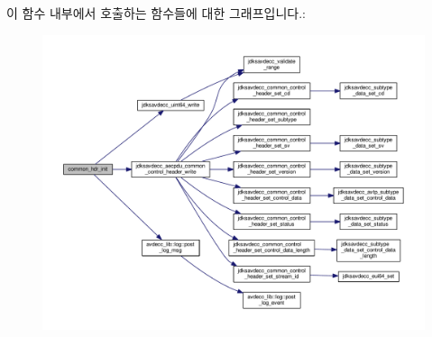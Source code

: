 이 함수 내부에서 호출하는 함수들에 대한 그래프입니다.\+:
\nopagebreak
\begin{figure}[H]
\begin{center}
\leavevmode
\includegraphics[width=350pt]{classavdecc__lib_1_1aecp__controller__state__machine_aafc737d7ed17a62fed9df6528f18d3ec_cgraph}
\end{center}
\end{figure}




